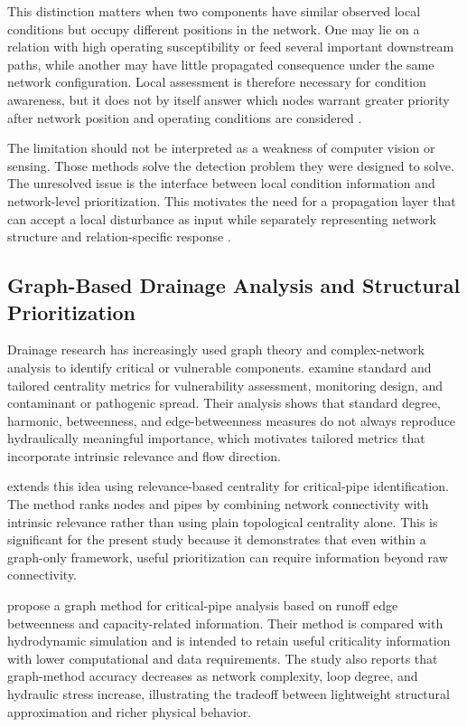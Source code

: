 This distinction matters when two components have similar observed local
conditions but occupy different positions in the network. One may lie on
a relation with high operating susceptibility or feed several important
downstream paths, while another may have little propagated consequence
under the same network configuration. Local assessment is therefore
necessary for condition awareness, but it does not by itself answer which
nodes warrant greater priority after network position and operating
conditions are considered \citep{simone2022,dastgir2023,zhang2025}.

The limitation should not be interpreted as a weakness of computer
vision or sensing. Those methods solve the detection problem they were
designed to solve. The unresolved issue is the interface between local
condition information and network-level prioritization. This motivates
the need for a propagation layer that can accept a local disturbance as
input while separately representing network structure and
relation-specific response \citep{simone2022,dastgir2023,meijer2023}.

\subsection{Graph-Based Drainage Analysis and Structural
Prioritization}\label{graph-based-drainage-analysis-and-structural-prioritization}

Drainage research has increasingly used graph theory and complex-network
analysis to identify critical or vulnerable components. \citet{simone2022} examine standard and tailored centrality metrics for
vulnerability assessment, monitoring design, and contaminant or
pathogenic spread. Their analysis shows that standard degree, harmonic,
betweenness, and edge-betweenness measures do not always reproduce
hydraulically meaningful importance, which motivates tailored metrics
that incorporate intrinsic relevance and flow direction.

\citet{simone2023} extends this idea using relevance-based centrality for
critical-pipe identification. The method ranks nodes and pipes by
combining network connectivity with intrinsic relevance rather than
using plain topological centrality alone. This is significant for the
present study because it demonstrates that even within a graph-only
framework, useful prioritization can require information beyond raw
connectivity.

\citet{dastgir2023} propose a graph method for critical-pipe
analysis based on runoff edge betweenness and capacity-related
information. Their method is compared with hydrodynamic simulation and
is intended to retain useful criticality information with lower
computational and data requirements. The study also reports that
graph-method accuracy decreases as network complexity, loop degree, and
hydraulic stress increase, illustrating the tradeoff between lightweight
structural approximation and richer physical behavior.

